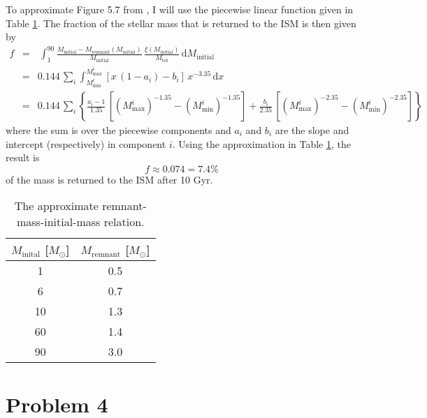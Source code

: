 \documentclass[11pt]{article}
\newcommand{\tab}[1]{Table \ref{tab:#1}}
\newcommand{\tablabel}[1]{\label{tab:#1}}
\newcommand{\sun}{\odot}
\newcommand{\dd}{\ensuremath{\,\mathrm{d}}}
\begin{document}
To approximate Figure 5.7 from \citet{BM}, I will use the piecewise linear
function given in \tab{remnant}. The fraction of the stellar mass that is
returned to the ISM is then given by
\begin{eqnarray}
    f & = & \, \int _1 ^{90} \frac{M_\mathrm{initial} -
    M_\mathrm{remnant} (M_\mathrm{initial})}{M_\mathrm{initial}} \,
    \frac{\xi (M_\mathrm{initial})}{M_\mathrm{tot}}
    \dd M_\mathrm{initial} \nonumber \\
    & = & 0.144 \, \sum_i \int_{M_\mathrm{min}^i} ^{M_\mathrm{max}^i}
    \left [x \, (1 - a_i) - b_i \right ] \, x^{-3.35} \dd x \\
    & = & 0.144 \, \sum_i \left \{
    \frac{a_i - 1}{1.35} \, \left [(M_\mathrm{max}^i)^{-1.35} -
        (M_\mathrm{min}^i)^{-1.35} \right ]
    + \frac{b_i}{2.35} \, \left [(M_\mathrm{max}^i)^{-2.35} -
        (M_\mathrm{min}^i)^{-2.35} \right ]
    \right \} \nonumber
\end{eqnarray}
where the sum is over the piecewise components and $a_i$ and $b_i$ are the
slope and intercept (respectively) in component $i$. Using the approximation
in \tab{remnant}, the result is
\begin{equation}
    f \approx 0.074 = 7.4 \%
\end{equation}
of the mass is returned to the ISM after 10 Gyr.

\begin{table}

    \centering

    \begin{tabular}{c c}

        $M_\mathrm{inital}$ [$M_\sun$] & $M_\mathrm{remnant}$ [$M_\sun$] \\

        \hline

        1  & 0.5 \\
        6  & 0.7 \\
        10 & 1.3 \\
        60 & 1.4 \\
        90 & 3.0 \\

    \end{tabular}

    \caption{The approximate remnant-mass-initial-mass relation.
        \tablabel{remnant}}

\end{table}


\section*{Problem 4}
\end{document}
